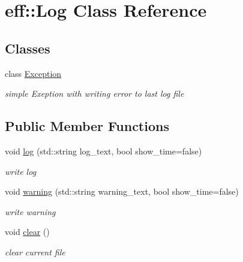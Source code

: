 \hypertarget{classeff_1_1Log}{}\section{eff\+:\+:Log Class Reference}
\label{classeff_1_1Log}
\subsection*{Classes}
\begin{DoxyCompactItemize}
\item 
class \mbox{\hyperlink{classeff_1_1Log_1_1Exception}{Exception}}
\begin{DoxyCompactList}\small\item\em simple Exeption with writing error to last log file \end{DoxyCompactList}\end{DoxyCompactItemize}
\subsection*{Public Member Functions}
\begin{DoxyCompactItemize}
\item 
\mbox{\label{classeff_1_1Log_a892a96fb637fb30449c91d7cb1e07c69}} 
void \mbox{\hyperlink{classeff_1_1Log_a892a96fb637fb30449c91d7cb1e07c69}{log}} (std\+::string log\+\_\+text, bool show\+\_\+time=false)
\begin{DoxyCompactList}\small\item\em write log \end{DoxyCompactList}\item 
\mbox{\label{classeff_1_1Log_a8d73934e2238241da184f9e4a5ed2a11}} 
void \mbox{\hyperlink{classeff_1_1Log_a8d73934e2238241da184f9e4a5ed2a11}{warning}} (std\+::string warning\+\_\+text, bool show\+\_\+time=false)
\begin{DoxyCompactList}\small\item\em write warning \end{DoxyCompactList}\item 
\mbox{\label{classeff_1_1Log_a5a50ce8ed135a05f9054932cffc959d0}} 
void \mbox{\hyperlink{classeff_1_1Log_a5a50ce8ed135a05f9054932cffc959d0}{clear}} ()
\begin{DoxyCompactList}\small\item\em clear current file \end{DoxyCompactList}\end{DoxyCompactItemize}
